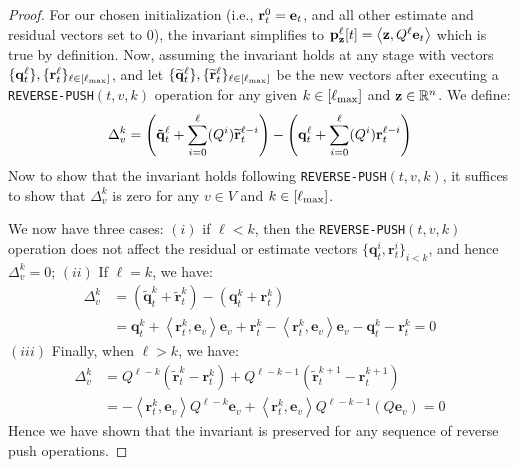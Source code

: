 \begin{proof}
For our chosen initialization (i.e., $\mathbf{r}^{0}_t = \mathbf{e}_t$, and all other estimate and residual vectors set to $0$), the invariant simplifies to $\mathbf{p}_{\mathbf{z}}^{\ell}[t] = \left< \mathbf{z} , Q^{\ell}\mathbf{e}_t \right>$ which is true by definition.
Now, assuming the invariant holds at any stage with vectors $\{\mathbf{q}^{\ell}_t\}, \{\mathbf{r}^{\ell}_t\}_{\ell\in[\ell_{\max}]}$, and let $\{\widetilde{\mathbf{q}}^{\ell}_t\}, \{\widetilde{\mathbf{r}}^{\ell}_t\}_{\ell\in[\ell_{\max}]}$ be the new vectors after executing a \texttt{REVERSE-PUSH}$(t,v,k)$ operation for any given $k\in[\ell_{\max}]$ and $\mathbf{z}\in\mathbb{R}^n$. We define:
$$\Delta_v^{k} = \left( \mathbf{\tilde{q}}_t^{\ell} + \sum_{i=0}^{\ell}  (Q^i)\widetilde{\mathbf{r}}^{\ell-i}_t \right)- \left( \mathbf{q}^{\ell}_t + \sum_{i=0}^{\ell}  (Q^i) \mathbf{r}_t^{\ell-i}\right)$$
Now to show that the invariant holds following \texttt{REVERSE-PUSH}$(t,v,k)$, it suffices to show that $\Delta_v^{k}$ is zero for any $v\in V$ and $k\in[\ell_{\max}]$. 

We now have three cases: $(i)$ if $\ell < k$, then the \texttt{REVERSE-PUSH}$(t,v,k)$ operation does not affect the residual or estimate vectors $\{\mathbf{q}_t^{i},\mathbf{r}_t^{i}\}_{i<k}$, and hence 
$\Delta_v^k=0$;
$(ii)$ If $\ell = k$, we have:
\begin{align*}
\Delta_v^{k} &= \left( \mathbf{\tilde{q}}_t^{k} +  \mathbf{\tilde{r}}_t^{k}\right)- \left( \mathbf{q}_t^{k} + \mathbf{r}_t^{k}\right)\\
&= \mathbf{q}_t^{k} + \left<\mathbf{r}_t^{k}, \mathbf{e}_v \right>\mathbf{e}_v +  \mathbf{r}_t^{k} - \left<\mathbf{r}_t^{k}, \mathbf{e}_v \right>\mathbf{e}_v - \mathbf{q}_t^{k} - \mathbf{r}_t^{k}
= 0
\end{align*}
$(iii)$ Finally, when $\ell > k$, we have: 
\begin{align*}
\Delta_v^k &= Q^{\ell-k}\left( \mathbf{\tilde{r}}_t^k - \mathbf{r}_t^k \right) + Q^{\ell-k-1}\left( \mathbf{\tilde{r}}_t^{k+1} - \mathbf{r}_t^{k+1} \right)\\
&= -\left<\mathbf{r}_t^k, \mathbf{e}_v \right>Q^{\ell-k}\mathbf{e}_v  + \left<\mathbf{r}_t^k, \mathbf{e}_v \right>Q^{\ell-k-1}\left(Q\mathbf{e}_v \right)
= 0
\end{align*}
Hence we have shown that the invariant is preserved for any sequence of reverse push operations.
\end{proof}

